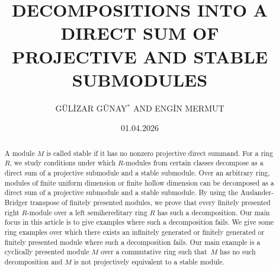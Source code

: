 \documentclass[11pt,a4paper]{amsart}
\theoremstyle{plain}
\theoremstyle{definition}
\theoremstyle{remark}
\begin{document}
\title{DECOMPOSITIONS INTO A DIRECT SUM OF \\ PROJECTIVE AND STABLE SUBMODULES}

\date{01.04.2026}

\author {G\"{U}L\.{I}ZAR G\"{U}NAY$^*$ AND 
ENG{\.{I}}N MERMUT}
\address{Dokuz Eyl\"ul \"Universitesi, T{\i}naztepe Yerle\c skesi, Fen Fak\"ultesi, Matematik B\"ol\"um\"u,  \mbox{ } 35390\\  
Buca/Izmir, Turkey}
\address{Graz University of Technology, Rechbauerstraße 12, 8010 Graz, Austria}





\begin{abstract}



A module $M$ is {called} stable if it has no nonzero projective direct summand.
For a ring $ R $, we study conditions under which $R$-modules from certain classes decompose as a direct sum of a projective submodule and a stable submodule.   
Over {an arbitrary} ring, modules of finite uniform dimension or finite hollow dimension can be decomposed as a direct sum of a projective submodule and a stable submodule. By using the Auslander-Bridger transpose of finitely presented modules, we prove that every finitely presented right $R$-module over a left semihereditary ring $R$ has such a decomposition. 
Our main focus in this article is to give examples where such a decomposition fails.
We give some ring examples over which there exists an infinitely generated or finitely generated or finitely presented module where such a decomposition fails. Our main example is a cyclically presented module $M$ over a commutative ring such that~$M$ has no such decomposition and $M$ is not projectively equivalent to a stable module.

\end{abstract}

\maketitle

\begingroup
\renewcommand{\thefootnote}{*}
\endgroup
\end{document}
